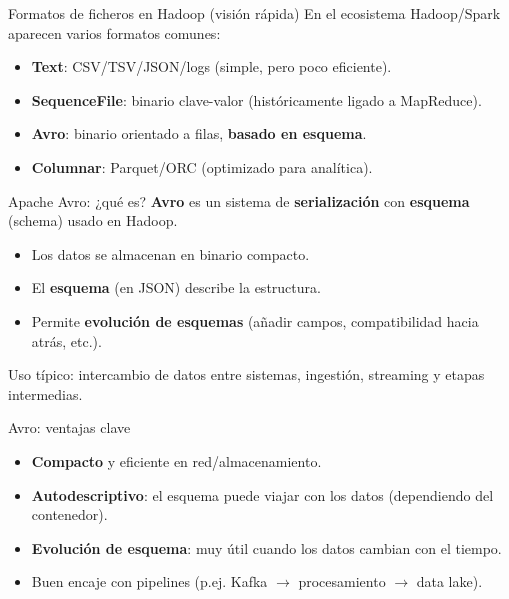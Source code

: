 \documentclass{beamer}
\begin{document}
\begin{frame}{Formatos de ficheros en Hadoop (visión rápida)}
En el ecosistema Hadoop/Spark aparecen varios formatos comunes:
\begin{itemize}
    \item \textbf{Text}: CSV/TSV/JSON/logs (simple, pero poco eficiente).
    \item \textbf{SequenceFile}: binario clave-valor (históricamente ligado a MapReduce).
    \item \textbf{Avro}: binario orientado a filas, \textbf{basado en esquema}.
    \item \textbf{Columnar}: Parquet/ORC (optimizado para analítica).
\end{itemize}
\end{frame}

\begin{frame}{Apache Avro: ¿qué es?}
\textbf{Avro} es un sistema de \textbf{serialización} con \textbf{esquema} (schema) usado en Hadoop.

\begin{itemize}
    \item Los datos se almacenan en binario compacto.
    \item El \textbf{esquema} (en JSON) describe la estructura.
    \item Permite \textbf{evolución de esquemas} (añadir campos, compatibilidad hacia atrás, etc.).
\end{itemize}

\medskip
Uso típico: intercambio de datos entre sistemas, ingestión, streaming y etapas intermedias.
\end{frame}

\begin{frame}{Avro: ventajas clave}
\begin{itemize}
    \item \textbf{Compacto} y eficiente en red/almacenamiento.
    \item \textbf{Autodescriptivo}: el esquema puede viajar con los datos (dependiendo del contenedor).
    \item \textbf{Evolución de esquema}: muy útil cuando los datos cambian con el tiempo.
    \item Buen encaje con pipelines (p.ej. Kafka $\rightarrow$ procesamiento $\rightarrow$ data lake).
\end{itemize}
\end{frame}
\end{document}
